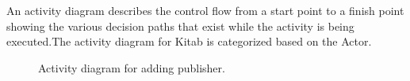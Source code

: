 
An activity diagram describes the control flow from a start point to a finish point showing the various decision paths that exist while the activity is being executed.The activity diagram for Kitab is categorized based on the Actor.


\begin{figure}[H]
\begin{center}	

	\caption{Activity diagram for adding publisher.}
	\label{dia_actvt_addpblshr}

\end{center}
\end{figure}

